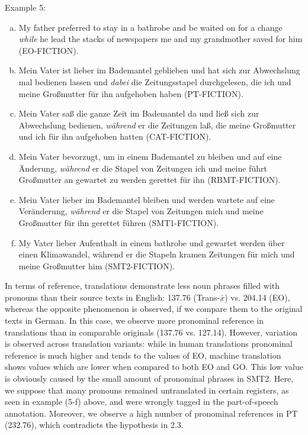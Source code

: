 \documentclass[output=paper]{LSP/langsci}
\begin{document}
\noindent Example 5:

\begin{enumerate}[a)]
\item My father preferred to stay in a bathrobe and be waited on for a change \textit{while} he lead the stacks of newspapers me and my grandmother saved for him (EO-FICTION).
\item Mein Vater ist lieber im Bademantel geblieben und hat sich zur Abwechslung mal bedienen lassen und \textit{dabei} die Zeitungsstapel durchgelesen, die ich und meine Großmutter für ihn aufgehoben haben (PT-FICTION).
\item Mein Vater saß die ganze Zeit im Bademantel da und ließ sich zur Abwechslung bedienen, \textit{während} er die Zeitungen laß, die meine Großmutter und ich für ihn aufgehoben hatten (CAT-FICTION).
\item Mein Vater bevorzugt, um in einem Bademantel zu bleiben und auf eine Änderung, \textit{während} er die Stapel von Zeitungen ich und meine führt Großmutter an gewartet zu werden gerettet für ihn (RBMT-FICTION). 
\item Mein Vater lieber im Bademantel bleiben und werden wartete auf eine Veränderung, \textit{während} er die Stapel von Zeitungen mich und meine Großmutter für ihn gerettet führen (SMT1-FICTION).
\item My Vater lieber Aufenthalt in einem bathrobe und gewartet werden über einen Klimawandel, während er die Stapeln kramen Zeitungen für mich und meine Großmutter him (SMT2-FICTION).
\end{enumerate}

In terms of reference, translations demonstrate less noun phrases filled with pronouns than their source texts in English: 137.76 (Trans-$\bar{x}$) vs. 204.14 (EO), whereas the opposite phenomenon is observed, if we compare them to the original texts in German. In this case, we observe more pronominal reference in translations than in comparable originals (137.76 vs. 127.14). However, variation is observed across translation variants: while in human translations pronominal reference is much higher and tends to the values of EO, machine translation shows values which are lower when compared to both EO and GO. This low value is obviously caused by the small amount of pronominal phrases in SMT2. Here, we suppose that many pronouns remained untranslated in certain registers, as seen in example (5-f) above, and were wrongly tagged in the part-of-speech annotation. Moreover, we observe a high number of pronominal references in PT (232.76), which contradicts the hypothesis in 2.3.
\end{document}
